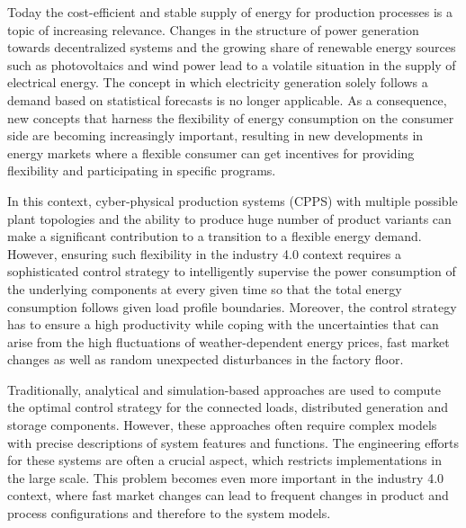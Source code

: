 
Today the cost-efficient and stable supply of energy for production processes is a topic of increasing relevance. Changes in the structure of power generation towards decentralized systems and the growing share of renewable energy sources such as photovoltaics and wind power lead to a volatile situation in the supply of electrical energy. The concept in which electricity generation solely follows a demand based on statistical forecasts is no longer applicable. As a consequence, new concepts that harness the flexibility of energy consumption on the consumer side are becoming increasingly important, resulting in new developments in energy markets where a flexible consumer can get incentives for providing flexibility and participating in specific programs.

In this context, cyber-physical production systems (CPPS) with multiple possible plant topologies and the ability to produce huge number of product variants can make a significant contribution to a transition to a flexible energy demand. However, ensuring such flexibility in the industry 4.0 context requires a sophisticated control strategy to intelligently supervise the power consumption of the underlying components at every given time so that the total energy consumption follows given load profile boundaries. Moreover, the control strategy has to ensure a high productivity while coping with the uncertainties that can arise from the high fluctuations of weather-dependent energy prices, fast market changes as well as random unexpected disturbances in the factory floor.

Traditionally, analytical and simulation-based approaches are used to compute the optimal control strategy for the connected loads, distributed generation and storage components. However, these approaches often require complex models with precise descriptions of system features and functions. The engineering efforts for these systems are often a crucial aspect, which restricts implementations in the large scale. This problem becomes even more important in the industry 4.0 context, where fast market changes can lead to frequent changes in product and process configurations and therefore to the system models.

